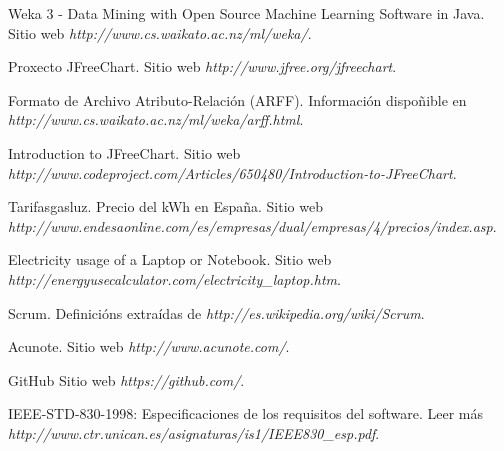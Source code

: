 

\begin{thebibliography}{99}

 Weka 3 - Data Mining with Open Source Machine Learning Software in Java. Sitio web {\it http://www.cs.waikato.ac.nz/ml/weka/}.

 Proxecto JFreeChart. Sitio web {\it http://www.jfree.org/jfreechart}.

 Formato de Archivo Atributo-Relación (ARFF). Información dispoñible en {\it http://www.cs.waikato.ac.nz/ml/weka/arff.html}.

 Introduction to JFreeChart. Sitio web {\it http://www.codeproject.com/Articles/650480/Introduction-to-JFreeChart}.

 Tarifasgasluz. Precio del kWh en España. Sitio web {\it http://www.endesaonline.com/es/empresas/dual/empresas/4/precios/index.asp}.

 Electricity usage of a Laptop or Notebook. Sitio web {\it http://energyusecalculator.com/electricity\_laptop.htm}.

 Scrum. Definicións extraídas de {\it http://es.wikipedia.org/wiki/Scrum}.

 Acunote. Sitio web {\it http://www.acunote.com/}.

 GitHub Sitio web {\it https://github.com/}.

 IEEE-STD-830-1998: Especificaciones de los requisitos del software. Leer más {\it http://www.ctr.unican.es/asignaturas/is1/IEEE830_esp.pdf}.

\end{thebibliography}

